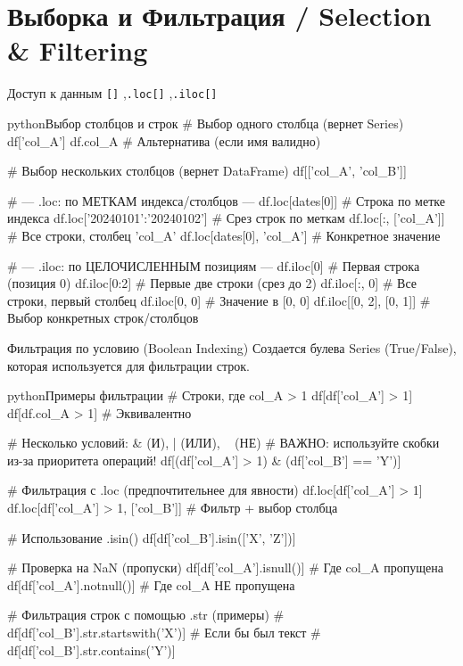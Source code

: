 \section{Выборка и Фильтрация / Selection \& Filtering}
\begin{textbox}{Доступ к данным}
 \texttt{[]} \sep \texttt{.loc[]} \sep \texttt{.iloc[]}

\begin{codebox}{python}{Выбор столбцов и строк}
# Выбор одного столбца (вернет Series)
df['col_A']
df.col_A # Альтернатива (если имя валидно)

# Выбор нескольких столбцов (вернет DataFrame)
df[['col_A', 'col_B']]

# --- .loc: по МЕТКАМ индекса/столбцов ---
df.loc[dates[0]]              # Строка по метке индекса
df.loc['20240101':'20240102'] # Срез строк по меткам
df.loc[:, ['col_A']]          # Все строки, столбец 'col_A'
df.loc[dates[0], 'col_A']     # Конкретное значение

# --- .iloc: по ЦЕЛОЧИСЛЕННЫМ позициям ---
df.iloc[0]          # Первая строка (позиция 0)
df.iloc[0:2]        # Первые две строки (срез до 2)
df.iloc[:, 0]       # Все строки, первый столбец
df.iloc[0, 0]       # Значение в [0, 0]
df.iloc[[0, 2], [0, 1]] # Выбор конкретных строк/столбцов
\end{codebox}
\end{textbox}

\begin{myexampleblock}{Фильтрация по условию (Boolean Indexing)}
Создается булева Series (True/False), которая используется для фильтрации строк.

\begin{codebox}{python}{Примеры фильтрации}
# Строки, где col_A > 1
df[df['col_A'] > 1]
df[df.col_A > 1] # Эквивалентно

# Несколько условий: & (И), | (ИЛИ), ~ (НЕ)
# ВАЖНО: используйте скобки из-за приоритета операций!
df[(df['col_A'] > 1) & (df['col_B'] == 'Y')]

# Фильтрация с .loc (предпочтительнее для явности)
df.loc[df['col_A'] > 1]
df.loc[df['col_A'] > 1, ['col_B']] # Фильтр + выбор столбца

# Использование .isin()
df[df['col_B'].isin(['X', 'Z'])]

# Проверка на NaN (пропуски)
df[df['col_A'].isnull()]    # Где col_A пропущена
df[df['col_A'].notnull()]   # Где col_A НЕ пропущена

# Фильтрация строк с помощью .str (примеры)
# df[df['col_B'].str.startswith('X')] # Если бы был текст
# df[df['col_B'].str.contains('Y')]
\end{codebox}
\end{myexampleblock}

